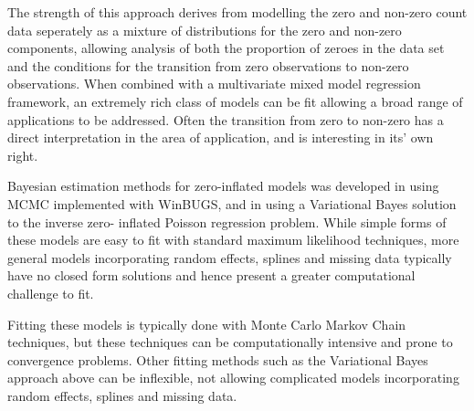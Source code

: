 The strength of this approach derives from modelling the zero and non-zero
count data seperately as a mixture of distributions for the zero and non-zero
components, allowing analysis of both the proportion of zeroes in the data set
and the conditions for the transition from zero observations to non-zero
observations. When combined with a multivariate mixed model regression
framework, an extremely rich class of models can be fit allowing a broad range
of applications to be addressed. Often the transition from zero to non-zero has
a direct interpretation in the area of application, and is interesting in its'
own right.

Bayesian estimation methods for zero-inflated models was developed in
\cite{Ghosh2006} using MCMC implemented with WinBUGS, and in \cite{Vatsa2014}
using a Variational Bayes solution to the inverse zero- inflated Poisson
regression problem. While simple forms of these models are easy to fit with
standard  maximum likelihood techniques, more general models incorporating
random effects, splines and missing data  typically have no closed form
solutions and hence present a greater computational challenge to fit.

Fitting these models is typically done with Monte Carlo Markov Chain
techniques, but these techniques can be computationally intensive and prone to
convergence problems.  Other fitting methods such as the Variational Bayes
approach above can be inflexible, not allowing complicated models incorporating
random effects, splines and missing data.

